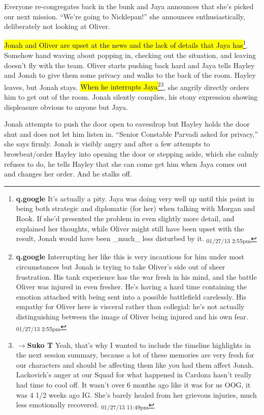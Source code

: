 Everyone re-congregates back in the bunk and Jaya announces that she's picked our next mission. ``We're going to Nicklepan!'' she announces enthusiastically, deliberately not looking at Oliver.



\hl{Jonah and Oliver are upset at the news and the lack of details that Jaya has}\footnote{\textbf{q.google }It's actually a pity. Jaya was doing very well up until this point in being both strategic and diplomatic (for her) when talking with Morgan and Rook.  If she'd presented the problem in even slightly more detail, and explained her thoughts, while Oliver might still have been upset with the result, Jonah would have been \_much\_ less disturbed by it. \textsubscript{01/27/13 2:55pm}}.  Somehow hand waving about popping in, checking out the situation, and leaving doesn't fly with the team.  Oliver starts pushing back hard and Jaya tells Hayley and Jonah to give them some privacy and walks to the back of the room.  Hayley leaves, but Jonah stays.  \hl{When he interrupts Jaya}\footnote{\textbf{q.google }Interrupting her like this is very incautious for him under most circumstances but Jonah is trying to take Oliver's side out of sheer frustration.  His tank experience has the war fresh in his mind, and the battle Oliver was injured in even fresher.    He's having a hard time containing the emotion attached with being sent into a possible battlefield carelessly.  His empathy for Oliver here is visceral rather than collegial: he's not actually distinguishing between the image of Oliver being injured and his own fear. \textsubscript{01/27/13 2:55pm}}\footnote{$\rightarrow$\textbf{Suko T }Yeah, that's why I wanted to include the timeline highlights in the next session summary, because a lot of these memories are very fresh for our characters and should be affecting them like you had them affect Jonah.  Lackovich's anger at our Squad for what happened in Cardoza hasn't really had time to cool off.  It wasn't over 6 months ago like it was for us OOG, it was 4 1/2 weeks ago IG.  She's barely healed from her grievous injuries, much less emotionally recovered. \textsubscript{01/27/13 11:49pm}}, she angrily directly orders him to get out of the room.  Jonah silently complies, his stony expression showing displeasure obvious to anyone but Jaya.



Jonah attempts to push the door open to eavesdrop but Hayley holds the door shut and does not let him listen in.  ``Senior Constable Parvadi asked for privacy,'' she says firmly.  Jonah is visibly angry and after a few attempts to browbeat/order Hayley into opening the door or stepping aside, which she calmly refuses to do, he tells Hayley that she can come get him when Jaya comes out and changes her order.  And he stalks off.



